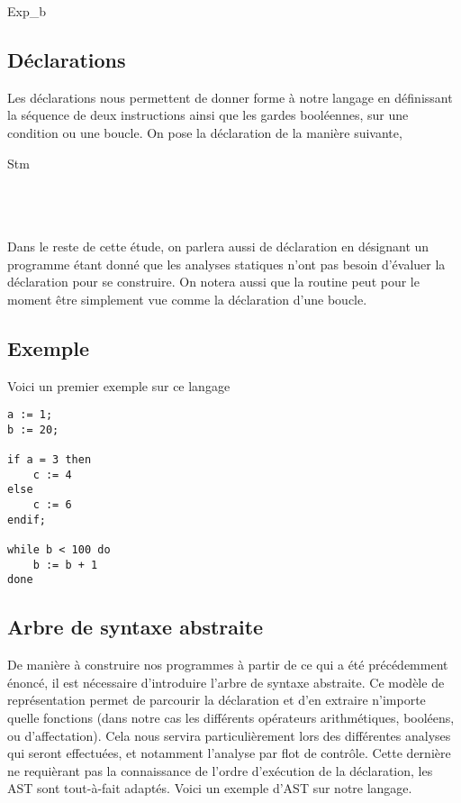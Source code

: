 \documentclass[a4paper, 12pt]{article}
\begin{document}
\begin{dtype}{Exp_b}
  \\
\end{dtype}

\subsection{Déclarations}
Les déclarations nous permettent de donner forme à notre langage en définissant la séquence de deux instructions ainsi
que les gardes booléennes, sur une condition ou une boucle. On pose la déclaration de la manière suivante,

\begin{dtype}{Stm}
  \\
  \\
  \akind{\sskip}\\
  \\
\end{dtype}
Dans le reste de cette étude, on parlera aussi de déclaration en désignant un programme étant donné que les analyses statiques
n'ont pas besoin d'évaluer la déclaration pour se construire. On notera aussi que la routine peut pour le moment être
simplement vue comme la déclaration d'une boucle. 

\subsection{Exemple}
Voici un premier exemple sur ce langage
\begin{lstlisting}[tabsize=2]
a := 1;
b := 20;

if a = 3 then
	c := 4
else
	c := 6
endif;

while b < 100 do
	b := b + 1
done
\end{lstlisting}

\subsection{Arbre de syntaxe abstraite}
De manière à construire nos programmes à partir de ce qui a été précédemment énoncé, il est nécessaire d'introduire 
l'arbre de syntaxe abstraite. Ce modèle de représentation permet de parcourir la déclaration et d'en extraire n'importe
quelle fonctions (dans notre cas les différents opérateurs arithmétiques, booléens, ou d'affectation). 
Cela nous servira particulièrement lors des différentes analyses qui seront effectuées, et notamment l'analyse par flot de contrôle. 
Cette dernière ne requièrant pas la connaissance de l'ordre d'exécution de la déclaration, les AST sont tout-à-fait adaptés.
Voici un exemple d'AST sur notre langage.
\end{document}
